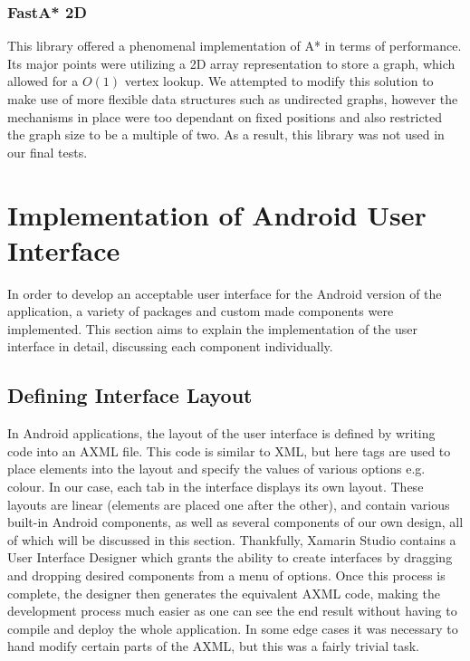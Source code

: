 \documentclass[12pt,a4paper]{report}
\begin{document}
\subsubsection{FastA* 2D}
This library\cite{libFastA} offered a phenomenal implementation of A* in terms of performance. Its major points were utilizing a 2D array representation to store a graph, which allowed for a $O(1)$ vertex lookup. We attempted to modify this solution to make use of more flexible data structures such as undirected graphs, however the mechanisms in place were too dependant on fixed positions and also restricted the graph size to be a multiple of two. As a result, this library was not used in our final tests.

    \section{Implementation of Android User Interface}
        In order to develop an acceptable user interface for the Android version of the application, a variety of packages and custom made
        components were implemented. This section aims to explain the implementation of the user interface in detail, discussing each component
        individually.
        \subsection{Defining Interface Layout}
	        In Android applications, the layout of the user interface is defined by writing code into an AXML file. This code is similar to XML, but here tags are used to place elements into the layout and specify the values of various options e.g. colour.
           In our case, each tab in the interface displays its own layout.
            These layouts are linear (elements are placed one after the other), and contain various built-in Android components, as well
            as several components of our own design, all of which will be discussed in this section. Thankfully, Xamarin Studio contains a 
            User Interface Designer which grants the ability to create interfaces by dragging and dropping desired components from a menu
            of options. Once this process is complete, the designer then generates the equivalent AXML code, making the development process
            much easier as one can see the end result without having to compile and deploy the whole application. In some edge cases it was necessary
            to hand modify certain parts of the AXML, but this was a fairly trivial task.
\end{document}
